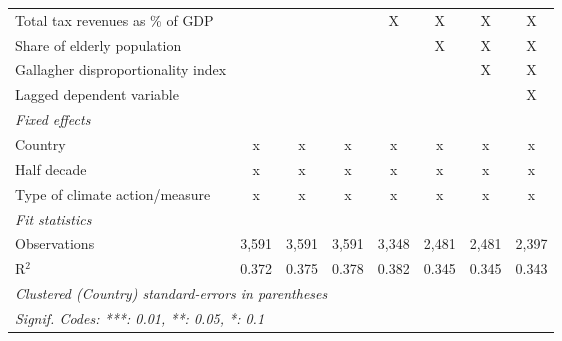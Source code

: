 \begin{tabular}{lccccccc}
   Total tax revenues as \% of GDP                                                         &                &               &               & X             & X            & X            & X\\  
   Share of elderly population                                                             &                &               &               &               & X            & X            & X\\  
   Gallagher disproportionality index                                                      &                &               &               &               &              & X            & X\\  
   Lagged dependent variable                                                               &                &               &               &               &              &              & X\\  
   \emph{Fixed effects}\\
   Country                                                                                 & x              & x             & x             & x             & x            & x            & x\\  
   Half decade                                                                             & x              & x             & x             & x             & x            & x            & x\\  
   Type of climate action/measure                                                          & x              & x             & x             & x             & x            & x            & x\\  
   \midrule \emph{Fit statistics}\\
   Observations                                                                            & 3,591          & 3,591         & 3,591         & 3,348         & 2,481        & 2,481        & 2,397\\  
   R$^2$                                                                                   & 0.372          & 0.375         & 0.378         & 0.382         & 0.345        & 0.345        & 0.343\\  
   \midrule
   \multicolumn{8}{l}{\emph{Clustered (Country) standard-errors in parentheses}}\\
   \multicolumn{8}{l}{\emph{Signif. Codes: ***: 0.01, **: 0.05, *: 0.1}}\\
\end{tabular}
\par\endgroup


